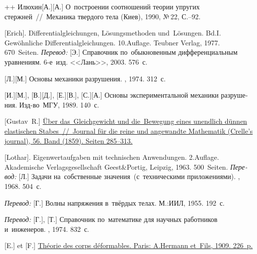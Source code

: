 \begin{thebibliography}{123}
\begin{otherlanguage}{russian}
++ {Илюхин}[А.][А.] О~построении соотношений теории упругих стержней~//~Механика твердого тела (Киев), 1990, №\,22, С.\hbox{--}92.

[Erich]. Differentialgleichungen, Lösungsmethoden und~Lö\-sun\-gen. Bd.\:I. Gewöhnliche Differentialgleichungen. 10.\:Auflage. Teubner Verlag, 1977. 670~Seiten.
\emph{Перевод:} [Э.] Справочник по~обыкновенным дифференциальным уравнениям. 6\hbox{-}е~изд. <<Лань>>, 2003. 576~с.

[Л.][М.] Основы механики разрушения. \naukapublisher, 1974. 312~с.

[И.][М.], [В.][Д.], [Е.][В.], [С.][А.]
Основы экспериментальной механики разрушения. Изд\hbox{-}во~МГУ, 1989. 140~с.

[Gustav~R.] \href{https://opacplus.bsb-muenchen.de/Vta2/bsb10525510/bsb:2960444?page=291}{Über das~Gleichgewicht und die~Bewegung eines unendlich dünnen elastischen Stabes~//~Journal für die reine und angewandte Mathematik (Crelle’s journal), 56. Band (1859). Seiten 285\hbox{--}313.}

[Lothar]. Eigenwertaufgaben mit technischen Anwendungen. 2.\:Auflage. Akademische Verlagsgesellschaft Geest\;\&\;Portig, Leipzig, 1963. 500~Seiten.
\emph{Перевод:} [Л.] Задачи на~собственные значения~(с~техническими приложениями). \naukapublisher, 1968. 504~с.

\emph{Перевод:} [Г.] Волны напряжения в~твёрдых телах. М.:\;ИИЛ, 1955. 192~с.

\emph{Перевод:} [Г.], [Т.] Справочник по~математике для научных работников и~инженеров. \naukapublisher, 1974. 832~с.

[E.] et [F.] \href{https://jscholarship.library.jhu.edu/bitstream/handle/1774.2/34209/31151000327233.pdf}{Théorie des corps déformables. Paris: A.\:Hermann et~Fils, 1909. 226~p.}


\end{otherlanguage}
\end{thebibliography}
